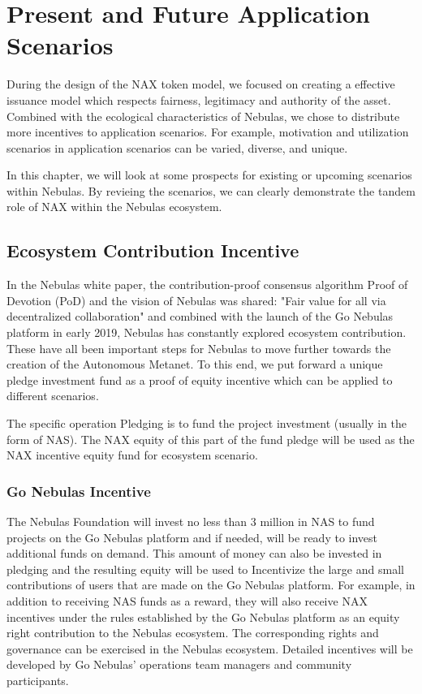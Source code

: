 \section{Present and Future Application Scenarios}
During the design of the NAX token model, we focused on creating a effective issuance model which respects fairness, legitimacy and authority of the asset. Combined with the ecological characteristics of Nebulas, we chose to distribute more incentives to application scenarios. For example, motivation and utilization scenarios in application scenarios can be varied, diverse, and unique.

In this chapter, we will look at some prospects for existing or upcoming scenarios within Nebulas. By revieing the scenarios, we can clearly demonstrate the tandem role of NAX within the Nebulas ecosystem.

\subsection{Ecosystem Contribution Incentive}
In the Nebulas white paper, the contribution-proof consensus algorithm Proof of Devotion (PoD) and the vision of Nebulas was shared: "Fair value for all via decentralized collaboration" and combined with the launch of the Go Nebulas platform in early 2019, Nebulas has constantly explored ecosystem contribution. These have all been important steps for Nebulas to move further towards the creation of the Autonomous Metanet. To this end, we put forward a unique pledge investment fund as a proof of equity incentive which can be applied to different scenarios.

The specific operation Pledging is to fund the project investment (usually in the form of NAS). The NAX equity of this part of the fund pledge will be used as the NAX incentive equity fund for ecosystem scenario.

\subsubsection{Go Nebulas Incentive}
The Nebulas Foundation will invest no less than $3$ million in NAS to fund projects on the Go Nebulas platform and if needed, will be ready to invest additional funds on demand. This amount of money can also be invested in pledging and the resulting equity will be used to Incentivize the large and small contributions of users that are made on the Go Nebulas platform. For example, in addition to receiving NAS funds as a reward, they will also receive NAX incentives under the rules established by the Go Nebulas platform as an equity right contribution to the Nebulas ecosystem. The corresponding rights and governance can be exercised in the Nebulas ecosystem. Detailed incentives will be developed by Go Nebulas' operations team managers and community participants.

